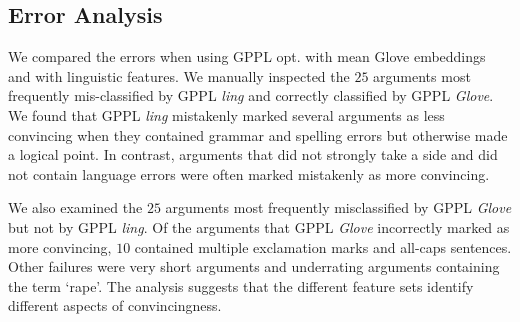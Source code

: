 \subsection{Error Analysis}

We compared the errors when using GPPL opt. with mean Glove embeddings
and with linguistic features. We
manually inspected the $25$ arguments most frequently
mis-classified by GPPL \emph{ling} and correctly classified by GPPL \emph{Glove}.
We found that GPPL \emph{ling} mistakenly marked several arguments 
as less convincing when they contained grammar and spelling errors but otherwise
made a logical point. 
In contrast, arguments that did not strongly take a side and did not contain 
language errors were often marked mistakenly as more convincing.

We also examined the $25$ arguments most frequently misclassified by GPPL \emph{Glove} but not by GPPL \emph{ling}.
Of the arguments that GPPL \emph{Glove} incorrectly marked as more convincing, 
$10$ contained multiple exclamation marks and all-caps sentences. 
Other failures were very short arguments and underrating arguments containing the term `rape'.
The analysis suggests that the different feature sets identify different aspects of convincingness.

